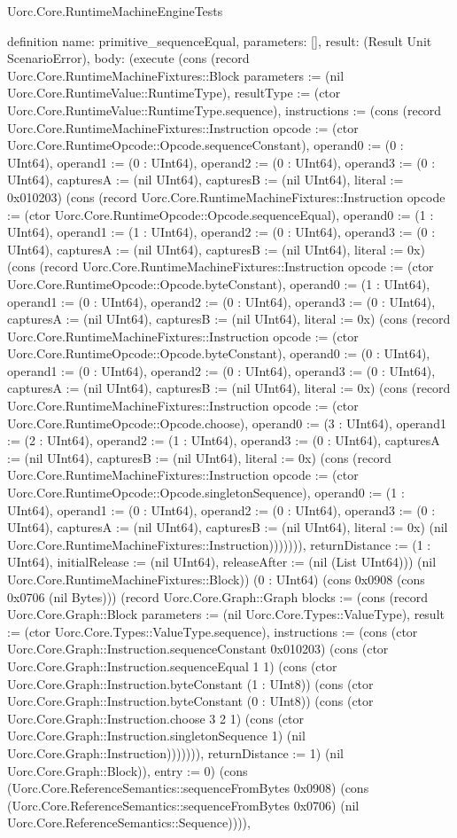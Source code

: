 \begin{lexlean}{Uorc.Core.RuntimeMachineEngineTests}
\begin{semanticmodule}
definition{
  name: primitive_sequenceEqual,
  parameters: [],
  result: (Result Unit ScenarioError),
  body: (execute (cons (record Uorc.Core.RuntimeMachineFixtures::Block {parameters := (nil Uorc.Core.RuntimeValue::RuntimeType), resultType := (ctor Uorc.Core.RuntimeValue::RuntimeType.sequence), instructions := (cons (record Uorc.Core.RuntimeMachineFixtures::Instruction {opcode := (ctor Uorc.Core.RuntimeOpcode::Opcode.sequenceConstant), operand0 := (0 : UInt64), operand1 := (0 : UInt64), operand2 := (0 : UInt64), operand3 := (0 : UInt64), capturesA := (nil UInt64), capturesB := (nil UInt64), literal := 0x010203}) (cons (record Uorc.Core.RuntimeMachineFixtures::Instruction {opcode := (ctor Uorc.Core.RuntimeOpcode::Opcode.sequenceEqual), operand0 := (1 : UInt64), operand1 := (1 : UInt64), operand2 := (0 : UInt64), operand3 := (0 : UInt64), capturesA := (nil UInt64), capturesB := (nil UInt64), literal := 0x}) (cons (record Uorc.Core.RuntimeMachineFixtures::Instruction {opcode := (ctor Uorc.Core.RuntimeOpcode::Opcode.byteConstant), operand0 := (1 : UInt64), operand1 := (0 : UInt64), operand2 := (0 : UInt64), operand3 := (0 : UInt64), capturesA := (nil UInt64), capturesB := (nil UInt64), literal := 0x}) (cons (record Uorc.Core.RuntimeMachineFixtures::Instruction {opcode := (ctor Uorc.Core.RuntimeOpcode::Opcode.byteConstant), operand0 := (0 : UInt64), operand1 := (0 : UInt64), operand2 := (0 : UInt64), operand3 := (0 : UInt64), capturesA := (nil UInt64), capturesB := (nil UInt64), literal := 0x}) (cons (record Uorc.Core.RuntimeMachineFixtures::Instruction {opcode := (ctor Uorc.Core.RuntimeOpcode::Opcode.choose), operand0 := (3 : UInt64), operand1 := (2 : UInt64), operand2 := (1 : UInt64), operand3 := (0 : UInt64), capturesA := (nil UInt64), capturesB := (nil UInt64), literal := 0x}) (cons (record Uorc.Core.RuntimeMachineFixtures::Instruction {opcode := (ctor Uorc.Core.RuntimeOpcode::Opcode.singletonSequence), operand0 := (1 : UInt64), operand1 := (0 : UInt64), operand2 := (0 : UInt64), operand3 := (0 : UInt64), capturesA := (nil UInt64), capturesB := (nil UInt64), literal := 0x}) (nil Uorc.Core.RuntimeMachineFixtures::Instruction))))))), returnDistance := (1 : UInt64), initialRelease := (nil UInt64), releaseAfter := (nil (List UInt64))}) (nil Uorc.Core.RuntimeMachineFixtures::Block)) (0 : UInt64) (cons 0x0908 (cons 0x0706 (nil Bytes))) (record Uorc.Core.Graph::Graph {blocks := (cons (record Uorc.Core.Graph::Block {parameters := (nil Uorc.Core.Types::ValueType), result := (ctor Uorc.Core.Types::ValueType.sequence), instructions := (cons (ctor Uorc.Core.Graph::Instruction.sequenceConstant 0x010203) (cons (ctor Uorc.Core.Graph::Instruction.sequenceEqual 1 1) (cons (ctor Uorc.Core.Graph::Instruction.byteConstant (1 : UInt8)) (cons (ctor Uorc.Core.Graph::Instruction.byteConstant (0 : UInt8)) (cons (ctor Uorc.Core.Graph::Instruction.choose 3 2 1) (cons (ctor Uorc.Core.Graph::Instruction.singletonSequence 1) (nil Uorc.Core.Graph::Instruction))))))), returnDistance := 1}) (nil Uorc.Core.Graph::Block)), entry := 0}) (cons (Uorc.Core.ReferenceSemantics::sequenceFromBytes 0x0908) (cons (Uorc.Core.ReferenceSemantics::sequenceFromBytes 0x0706) (nil Uorc.Core.ReferenceSemantics::Sequence)))),
}
\end{semanticmodule}
\end{lexlean}
